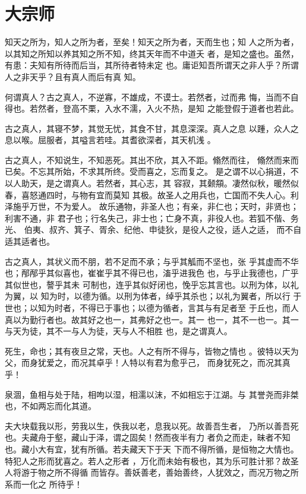 \documentclass[12pt,UTF8]{ctexbook}
\begin{document}
\section{大宗师}

知天之所为，知人之所为者，至矣！知天之所为者，天而生也；知 人之所为者，以其知之所知以养其知之所不知，终其天年而不中道夭 者，是知之盛也。虽然，有患：夫知有所待而后当，其所待者特未定 也。庸讵知吾所谓天之非人乎？所谓人之非天乎？且有真人而后有真 知。

何谓真人？古之真人，不逆寡，不雄成，不谟士。若然者，过而弗 悔，当而不自得也。若然者，登高不栗，入水不濡，入火不热，是知 之能登假于道者也若此。

古之真人，其寝不梦，其觉无忧，其食不甘，其息深深。真人之息 以踵，众人之息以喉。屈服者，其嗌言若哇。其耆欲深者，其天机浅 。

古之真人，不知说生，不知恶死。其出不欣，其入不距。翛然而往， 翛然而来而已矣。不忘其所始，不求其所终。受而喜之，忘而复之。 是之谓不以心捐道，不以人助天，是之谓真人。若然者，其心志，其 容寂，其颡頯。凄然似秋，暖然似春，喜怒通四时，与物有宜而莫知 其极。故圣人之用兵也，亡国而不失人心。利泽施乎万世，不为爱人。 故乐通物，非圣人也；有亲，非仁也；天时，非贤也；利害不通，非 君子也；行名失己，非士也；亡身不真，非役人也。若狐不偕、务光、 伯夷、叔齐、箕子、胥余、纪他、申徒狄，是役人之役，适人之适， 而不自适其适者也。

古之真人，其状义而不朋，若不足而不承；与乎其觚而不坚也，张 乎其虚而不华也；邴邴乎其似喜也，崔崔乎其不得已也，滀乎进我色 也，与乎止我德也，广乎其似世也，謷乎其未 可制也，连乎其似好闭也，悗乎忘其言也。以刑为体，以礼为翼，以 知为时，以德为循。以刑为体者，绰乎其杀也；以礼为翼者，所以行 于世也；以知为时者，不得已于事也；以德为循者，言其与有足者至 于丘也，而人真以为勤行者也。故其好之也一，其弗好之也一。其一 也一，其不一也一。其一与天为徒，其不一与人为徒，天与人不相胜 也，是之谓真人。

死生，命也；其有夜旦之常，天也。人之有所不得与，皆物之情也 。彼特以天为父，而身犹爱之，而况其卓乎！人特以有君为愈乎己， 而身犹死之，而况其真乎！

泉涸，鱼相与处于陆，相呴以湿，相濡以沫，不如相忘于江湖。与 其誉尧而非桀也，不如两忘而化其道。

夫大块载我以形，劳我以生，佚我以老，息我以死。故善吾生者， 乃所以善吾死也。夫藏舟于壑，藏山于泽，谓之固矣！然而夜半有力 者负之而走，昧者不知也。藏小大有宜，犹有所循。若夫藏天下于天 下而不得所循，是恒物之大情也。特犯人之形而犹喜之。若人之形者 ，万化而未始有极也，其为乐可胜计邪？故圣人将游于物之所不得循 而皆存。善妖善老，善始善终，人犹效之，而况万物之所系而一化之 所待乎！
\end{document}
